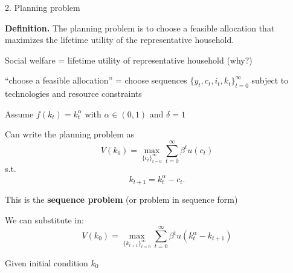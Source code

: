 \documentclass[11pt, aspectratio=169]{beamer}
\newenvironment{witemize}{\itemize\addtolength{\itemsep}{10pt}}{\enditemize}
\begin{document}
\begin{frame}{2. Planning problem}

\vspace{4mm}
\textbf{Definition.} The planning problem is to choose a feasible allocation that maximizes the lifetime utility of the representative household.  

\vspace{5mm}
\begin{witemize}
\item Social welfare = lifetime utility of representative household (why?)

\item ``choose a feasible allocation'' = choose sequences $\{y_t, c_t, i_t, k_t\}_{t = 0}^\infty$ subject to technologies and resource constraints
\end{witemize}
\end{frame}



\begin{frame}{}
\begin{witemize}
\item Assume $f(k_t) = k_t^\alpha$ with $\alpha \in (0, 1)$ and $\delta = 1$

\item Can write the planning problem as 
\begin{equation*}
	V(k_0) = \max_{ \{ c_t \}_{t=0}^\infty } \sum_{t = 0}^\infty \beta^t u(c_t)
\end{equation*}
s.t. 
\begin{equation*}
	k_{t+1} = k_t^\alpha - c_t. 
\end{equation*}

\item This is the \textbf{sequence problem} (or problem in sequence form)

\item We can substitute in: 
\begin{equation*}
	V(k_0) = \max_{ \{ k_{t+1} \}_{t=0}^\infty } \sum_{t = 0}^\infty \beta^t u(k_t^\alpha  - k_{t+1})
\end{equation*}

\item Given initial condition $k_0$

\end{witemize}
\end{frame}
\end{document}
